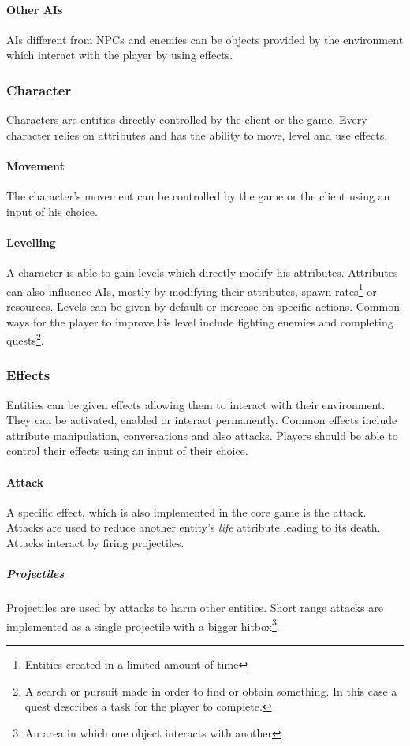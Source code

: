 \documentclass[11pt]{article}
\begin{document}
\paragraph{Other AIs}
AIs different from NPCs and enemies can be objects provided by the environment which interact with the player by using effects.
\subsubsection{Character}
Characters are entities directly controlled by the client or the game. 
Every character relies on attributes and has the ability to move, level and use effects.
\paragraph{Movement}
The character's movement can be controlled by the game or the client using an input of his choice.
\paragraph{Levelling}
A character is able to gain levels which directly modify his attributes.
Attributes can also influence AIs, mostly by modifying their attributes, spawn rates\footnote{Entities created in a limited amount of time} or resources.
Levels can be given by default or increase on specific actions. 
Common ways for the player to improve his level include fighting enemies and completing quests\footnote{A search or pursuit made in order to find or obtain something. 
In this case a quest describes a task for the player to complete.}.
\subsubsection{Effects}
Entities can be given effects allowing them to interact with their environment.
They can be activated, enabled or interact permanently. Common effects include attribute manipulation, conversations and also attacks.
Players should be able to control their effects using an input of their choice.
\paragraph{Attack}
A specific effect, which is also implemented in the core game is the attack. Attacks are used to reduce another entity's \textit{life} attribute leading to its death.
Attacks interact by firing projectiles.
\subparagraph{Projectiles}
Projectiles are used by attacks to harm other entities. Short range attacks are implemented as a single projectile with a bigger hitbox\footnote{An area in which one object interacts with another}.
\end{document}
